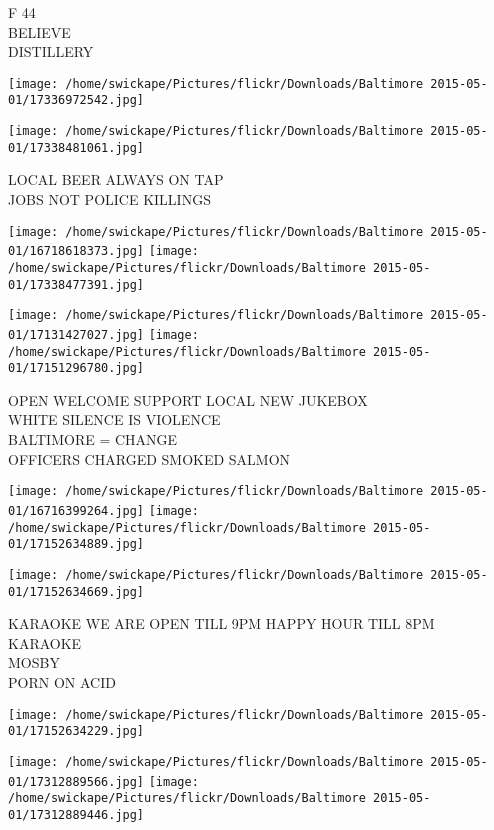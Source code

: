 \documentclass[10pt,letterpaper]{article}
\begin{document}
F 44\\
BELIEVE\\
DISTILLERY\\
\pagebreak

\texttt{[image: /home/swickape/Pictures/flickr/Downloads/Baltimore 2015-05-01/17336972542.jpg]}

\vspace{0.25in}
\texttt{[image: /home/swickape/Pictures/flickr/Downloads/Baltimore 2015-05-01/17338481061.jpg]}

LOCAL BEER ALWAYS ON TAP\\
JOBS NOT POLICE KILLINGS\\
\pagebreak

\texttt{[image: /home/swickape/Pictures/flickr/Downloads/Baltimore 2015-05-01/16718618373.jpg]}
\texttt{[image: /home/swickape/Pictures/flickr/Downloads/Baltimore 2015-05-01/17338477391.jpg]}

\texttt{[image: /home/swickape/Pictures/flickr/Downloads/Baltimore 2015-05-01/17131427027.jpg]}
\texttt{[image: /home/swickape/Pictures/flickr/Downloads/Baltimore 2015-05-01/17151296780.jpg]}

OPEN WELCOME SUPPORT LOCAL NEW JUKEBOX\\
WHITE SILENCE IS VIOLENCE\\
BALTIMORE = CHANGE\\
OFFICERS CHARGED SMOKED SALMON\\
\pagebreak

\texttt{[image: /home/swickape/Pictures/flickr/Downloads/Baltimore 2015-05-01/16716399264.jpg]}
\texttt{[image: /home/swickape/Pictures/flickr/Downloads/Baltimore 2015-05-01/17152634889.jpg]}

\texttt{[image: /home/swickape/Pictures/flickr/Downloads/Baltimore 2015-05-01/17152634669.jpg]}

KARAOKE WE ARE OPEN TILL 9PM HAPPY HOUR TILL 8PM KARAOKE\\
MOSBY\\
PORN ON ACID\\
\pagebreak

\texttt{[image: /home/swickape/Pictures/flickr/Downloads/Baltimore 2015-05-01/17152634229.jpg]}

\vspace{0.25in}
\texttt{[image: /home/swickape/Pictures/flickr/Downloads/Baltimore 2015-05-01/17312889566.jpg]}
\texttt{[image: /home/swickape/Pictures/flickr/Downloads/Baltimore 2015-05-01/17312889446.jpg]}
\end{document}
